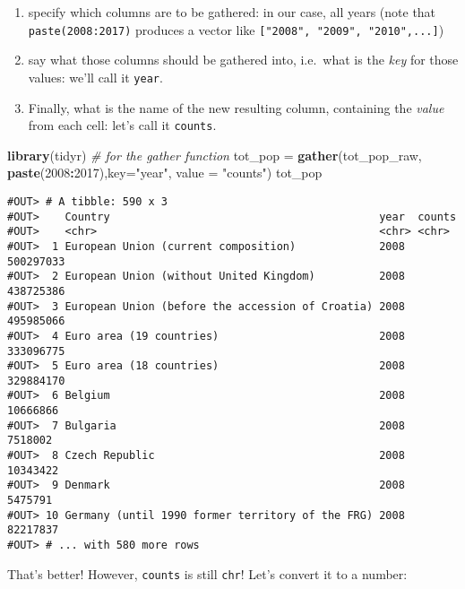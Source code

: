 \documentclass[]{book}
\newenvironment{Shaded}{\begin{snugshade}}{\end{snugshade}}
\newcommand{\CommentTok}[1]{\textcolor[rgb]{0.56,0.35,0.01}{\textit{#1}}}
\newcommand{\DataTypeTok}[1]{\textcolor[rgb]{0.13,0.29,0.53}{#1}}
\newcommand{\DecValTok}[1]{\textcolor[rgb]{0.00,0.00,0.81}{#1}}
\newcommand{\KeywordTok}[1]{\textcolor[rgb]{0.13,0.29,0.53}{\textbf{#1}}}
\newcommand{\NormalTok}[1]{#1}
\newcommand{\OperatorTok}[1]{\textcolor[rgb]{0.81,0.36,0.00}{\textbf{#1}}}
\newcommand{\StringTok}[1]{\textcolor[rgb]{0.31,0.60,0.02}{#1}}
\providecommand{\tightlist}{%
  \setlength{\itemsep}{0pt}\setlength{\parskip}{0pt}}
\begin{document}
\begin{enumerate}
\def\labelenumi{\arabic{enumi}.}
\tightlist
\item
  specify which columns are to be gathered: in our case, all years (note that \texttt{paste(2008:2017)} produces a vector like \texttt{{[}"2008",\ "2009",\ "2010",...{]}})
\item
  say what those columns should be gathered into, i.e.~what is the \emph{key} for those values: we'll call it \texttt{year}.
\item
  Finally, what is the name of the new resulting column, containing the \emph{value} from each cell: let's call it \texttt{counts}.
\end{enumerate}

\begin{Shaded}
\begin{Highlighting}[]
\KeywordTok{library}\NormalTok{(tidyr)   }\CommentTok{# for the gather function}
\NormalTok{tot_pop =}\StringTok{ }\KeywordTok{gather}\NormalTok{(tot_pop_raw, }\KeywordTok{paste}\NormalTok{(}\DecValTok{2008}\OperatorTok{:}\DecValTok{2017}\NormalTok{),}\DataTypeTok{key=}\StringTok{"year"}\NormalTok{, }\DataTypeTok{value =} \StringTok{"counts"}\NormalTok{)}
\NormalTok{tot_pop}
\end{Highlighting}
\end{Shaded}

\begin{verbatim}
#OUT> # A tibble: 590 x 3
#OUT>    Country                                          year  counts   
#OUT>    <chr>                                            <chr> <chr>    
#OUT>  1 European Union (current composition)             2008  500297033
#OUT>  2 European Union (without United Kingdom)          2008  438725386
#OUT>  3 European Union (before the accession of Croatia) 2008  495985066
#OUT>  4 Euro area (19 countries)                         2008  333096775
#OUT>  5 Euro area (18 countries)                         2008  329884170
#OUT>  6 Belgium                                          2008  10666866 
#OUT>  7 Bulgaria                                         2008  7518002  
#OUT>  8 Czech Republic                                   2008  10343422 
#OUT>  9 Denmark                                          2008  5475791  
#OUT> 10 Germany (until 1990 former territory of the FRG) 2008  82217837 
#OUT> # ... with 580 more rows
\end{verbatim}

That's better! However, \texttt{counts} is still \texttt{chr}! Let's convert it to a number:
\end{document}
